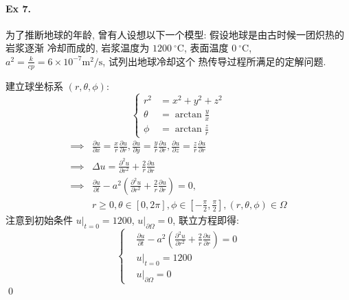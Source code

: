 \paragraph{Ex 7.}
为了推断地球的年龄, 曾有人设想以下一个模型: 假设地球是由古时候一团炽热的岩浆逐渐
冷却而成的, 岩浆温度为 $1200\ ^\circ \text{C}$, 表面温度 $0\ ^\circ \text{C}$,
$a^2 = \frac{k}{cp} = 6 \times 10^{-7} \text{m}^2/\text{s}$, 试列出地球冷却这个
热传导过程所满足的定解问题.

\solution 建立球坐标系 $(r, \theta, \phi)$:
\[ \left\{ \begin{aligned}
r^2 &= x^2 + y^2 + z^2 \\
\theta &= \arctan \frac{y}{x} \\
\phi &= \arctan \frac{z}{r}
\end{aligned} \right. \]
\[ \begin{aligned} \implies &
\frac{\partial u}{\partial x} = \frac{x}{r} \frac{\partial u}{\partial r}, 
\frac{\partial u}{\partial y} = \frac{y}{r} \frac{\partial u}{\partial r}, 
\frac{\partial u}{\partial z} = \frac{z}{r} \frac{\partial u}{\partial r} \\
\implies &
\Delta u = \frac{\partial^2 u}{\partial r^2}
  + \frac{2}{r} \frac{\partial u}{\partial r} \\
\implies &
\frac{\partial u}{\partial t} - a^2 \left(
  \frac{\partial^2 u}{\partial r^2} + \frac{2}{r} \frac{\partial u}{\partial r}
  \right) = 0, \\
& r \geq 0, \theta \in [0, 2\pi],
  \phi \in [-\frac{\pi}{2}, \frac{\pi}{2}], (r, \theta, \phi) \in \Omega
\end{aligned} \]
注意到初始条件 $u|_{t=0} = 1200$, $u|_{\partial \Omega} = 0$, 联立方程即得:
\[ \left\{ \begin{aligned} 
&\frac{\partial u}{\partial t} - a^2 \left(
  \frac{\partial^2 u}{\partial r^2} + \frac{2}{r} \frac{\partial u}{\partial r}
  \right) = 0 \\
&u|_{t=0} = 1200 \\
&u|_{\partial \Omega} = 0
\end{aligned} \right. \]
\qed

